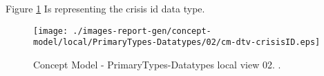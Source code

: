 Figure \ref{fig:lu.uni.lassy.excalibur.group09.spec-CM-view-local-PrimaryTypes-Datatypes-02} Is representing the crisis id data type.



\begin{figure}[htbp] 
\label{fig:lu.uni.lassy.excalibur.group09.spec-CM}
\begin{center}
\texttt{[image: ./images-report-gen/concept-model/local/PrimaryTypes-Datatypes/02/cm-dtv-crisisID.eps]}
\end{center}
\caption[Concept Model - PrimaryTypes-Datatypes local view 02 - ]{Concept Model - PrimaryTypes-Datatypes local view 02. .}
\label{fig:lu.uni.lassy.excalibur.group09.spec-CM-view-local-PrimaryTypes-Datatypes-02}
\end{figure}
\vspace{0.5cm} 
